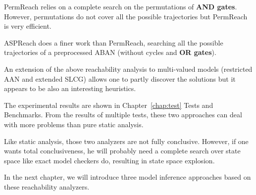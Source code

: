 PermReach relies on a complete search on the permutations of \textbf{AND gates}.
However, permutations do not cover all the possible trajectories but PermReach is very efficient.

ASPReach does a finer work than PermReach, searching all the possible trajectories of a preprocessed ABAN (without cycles and \textbf{OR gates}).

An extension of the above reachability analysis to multi-valued models (restricted AAN and extended SLCG) allows one to partly discover the solutions but it appears to be also an interesting heuristics. 

The experimental results are shown in Chapter~\ref{chap:test} Tests and Benchmarks.
From the results of multiple tests, these two approaches can deal with more problems than pure static analysis.

Like static analysis, those two analyzers are not fully conclusive.
However, if one wants total conclusiveness, he will probably %
need a complete search over state space like exact model checkers do, resulting in state space explosion.

In the next chapter, we will introduce three model inference approaches based on these reachability analyzers.
